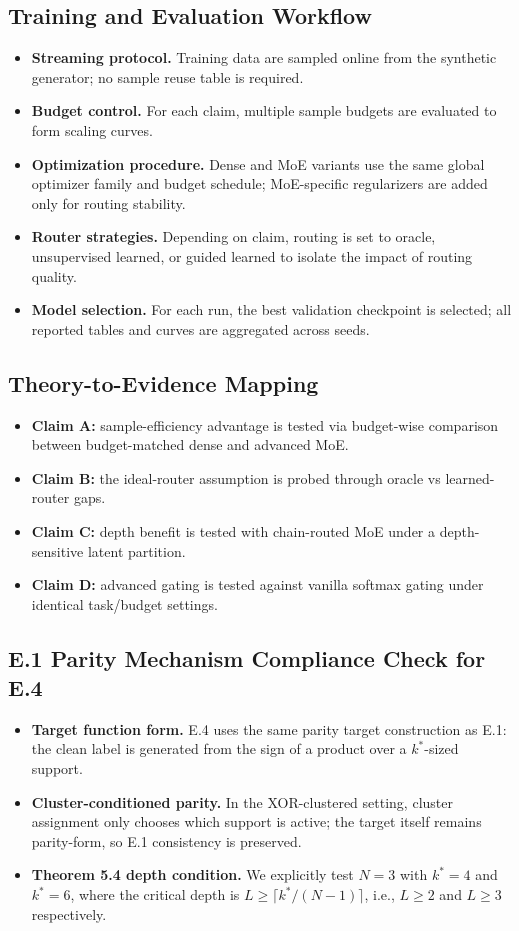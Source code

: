 \documentclass[11pt]{article}
\begin{document}
\subsection{Training and Evaluation Workflow}
\begin{itemize}
    \item \textbf{Streaming protocol.} Training data are sampled online from the synthetic generator; no sample reuse table is required.
    \item \textbf{Budget control.} For each claim, multiple sample budgets are evaluated to form scaling curves.
    \item \textbf{Optimization procedure.} Dense and MoE variants use the same global optimizer family and budget schedule; MoE-specific regularizers are added only for routing stability.
    \item \textbf{Router strategies.} Depending on claim, routing is set to oracle, unsupervised learned, or guided learned to isolate the impact of routing quality.
    \item \textbf{Model selection.} For each run, the best validation checkpoint is selected; all reported tables and curves are aggregated across seeds.
\end{itemize}

\subsection{Theory-to-Evidence Mapping}
\begin{itemize}
    \item \textbf{Claim A:} sample-efficiency advantage is tested via budget-wise comparison between budget-matched dense and advanced MoE.
    \item \textbf{Claim B:} the ideal-router assumption is probed through oracle vs learned-router gaps.
    \item \textbf{Claim C:} depth benefit is tested with chain-routed MoE under a depth-sensitive latent partition.
    \item \textbf{Claim D:} advanced gating is tested against vanilla softmax gating under identical task/budget settings.
\end{itemize}

\subsection{E.1 Parity Mechanism Compliance Check for E.4}
\begin{itemize}
    \item \textbf{Target function form.} E.4 uses the same parity target construction as E.1: the clean label is generated from the sign of a product over a $k^*$-sized support.
    \item \textbf{Cluster-conditioned parity.} In the XOR-clustered setting, cluster assignment only chooses which support is active; the target itself remains parity-form, so E.1 consistency is preserved.
    \item \textbf{Theorem 5.4 depth condition.} We explicitly test $N=3$ with $k^*=4$ and $k^*=6$, where the critical depth is $L \ge \lceil k^*/(N-1)\rceil$, i.e., $L\ge2$ and $L\ge3$ respectively.
\end{itemize}
\end{document}
